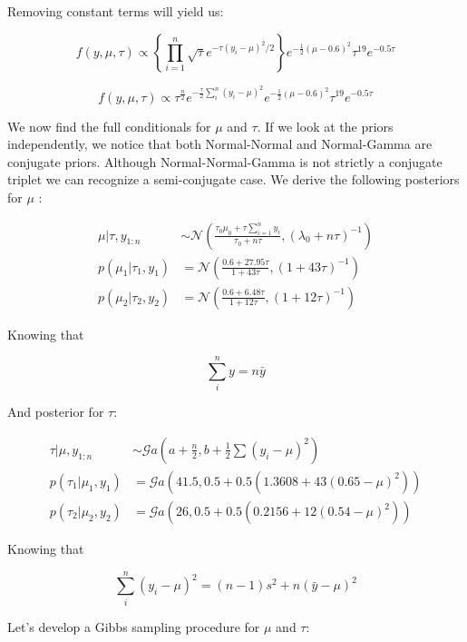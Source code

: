 \documentclass[a4 paper]{article}
\begin{document}
Removing constant terms will yield us:

$$
f(y,\mu,\tau)\propto\left\{ \prod_{i=1}^{n}\sqrt{\tau}e^{-\tau(y_{i}-\mu)^{2}/2}\right\} e^{-\frac{1}{2}\left(\mu-0.6\right)^{2}}\tau^{19}e^{-0.5\tau}
$$

$$
f(y,\mu,\tau)\propto\tau^{\frac{n}{2}}e^{-\frac{\tau}{2}\sum_{i}^{n}(y_{i}-\mu)^{2}}e^{-\frac{1}{2}\left(\mu-0.6\right)^{2}}\tau^{19}e^{-0.5\tau}
$$


We now find the full conditionals for $\mu$ and $\tau$.
If we look at the priors independently, we 
notice that both Normal-Normal and 
Normal-Gamma are conjugate priors. 
Although Normal-Normal-Gamma is not strictly
a conjugate triplet we can recognize
a semi-conjugate case. We 
derive the following posteriors 
for $\mu$ \cite{miller}:


\begin{align*}
\mu|\tau,y_{1:n}&\sim\mathcal{N}\left(\frac{\tau_{0}\mu_{0}+\tau\sum_{i=1}^{n}y_{i}}{\tau_{0}+n\tau},\left(\lambda_{0}+n\tau\right)^{-1}\right)\\p(\mu_{1}|\tau_{1},y_{1})&=\mathcal{N}\left(\frac{0.6+27.95\tau}{1+43\tau},\left(1+43\tau\right)^{-1}\right)\\p(\mu_{2}|\tau_{2},y_{2})&=\mathcal{N}\left(\frac{0.6+6.48\tau}{1+12\tau},\left(1+12\tau\right)^{-1}\right)
\end{align*}


Knowing that

$$
\sum_{i}^{n}y = n\bar{y}
$$


And posterior for $\tau$:

\begin{align*}
\tau|\mu,y_{1:n}&\sim\mathcal{G}a\left(a+\frac{n}{2},b+\frac{1}{2}\sum\left(y_{i}-\mu\right)^{2}\right)\\p(\tau_{1}|\mu_{1},y_{1})&=\mathcal{G}a\left(41.5,0.5+0.5\left(1.3608+43(0.65-\mu)^{2}\right)\right)\\p(\tau_{2}|\mu_{2},y_{2})&=\mathcal{G}a\left(26,0.5+0.5\left(0.2156+12(0.54-\mu)^{2}\right)\right)
\end{align*}


Knowing that

$$
\sum_{i}^{n}(y_{i}-\mu)^{2}=(n-1)s^{2}+n(\bar{y}-\mu)^{2}
$$


Let's develop a Gibbs sampling procedure
for $\mu$ and $\tau$:
\end{document}
